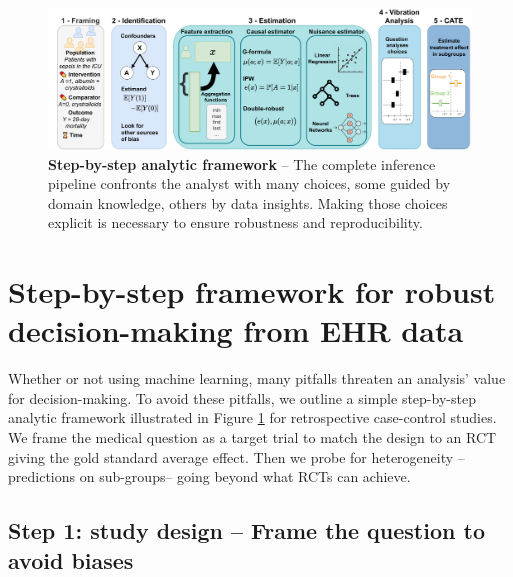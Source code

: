 \documentclass[10pt,letterpaper]{article}
\begin{document}
%

\begin{figure}[t!]
  \centering
  \includegraphics[width=0.9\linewidth]{img/complete_inference_flow.pdf}
  \caption{\textbf{Step-by-step analytic framework} -- The complete
    inference pipeline confronts the analyst with
    many choices, some guided by domain knowledge, others
    by data insights. Making those choices explicit is necessary to ensure
    robustness and reproducibility.}\label{fig:inference_framework}
\end{figure}


\section*{Step-by-step framework for robust decision-making from EHR data}\label{sec:inference_flow}

Whether or not using machine learning, many pitfalls threaten an analysis'
value for decision-making. To avoid these pitfalls, we outline a simple
step-by-step analytic framework illustrated in Figure
\ref{fig:inference_framework} for retrospective case-control studies. We frame
the medical question as a target trial \cite{hernan2021methods} to match the
design to an RCT giving the gold standard average effect. Then we probe for
heterogeneity --predictions on sub-groups--  going beyond what RCTs can
achieve.

\subsection*{Step 1: study design -- Frame the question to avoid biases}\label{sec:framing}
\end{document}
